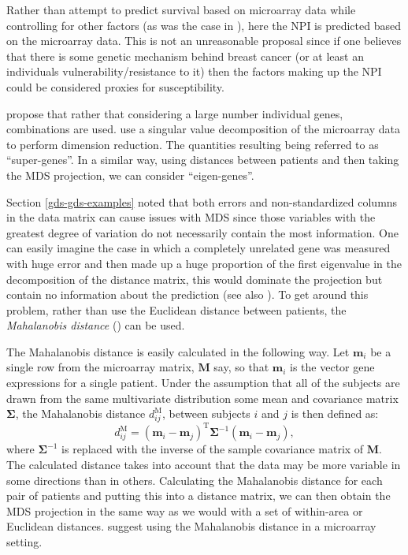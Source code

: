 Rather than attempt to predict survival based on microarray data while controlling for other factors (\label{cor-5s12}as was the case in ), here the NPI is predicted based on the microarray data. This is not an unreasonable proposal since if one believes that there is some genetic mechanism behind breast cancer (or at least an individuals vulnerability/resistance to it) then the factors making up the NPI could be considered proxies for susceptibility. 

 propose that rather that considering a large number individual genes, combinations are used.  use a singular value decomposition of the microarray data to perform dimension reduction. The quantities resulting being referred to as ``super-genes''. In a similar way, using distances between patients and then taking the MDS projection, we can consider ``eigen-genes''.

Section \ref{gds-gds-examples} noted that both errors and non-standardized columns in the data matrix can cause issues with MDS since those variables with the greatest degree of variation do not necessarily contain the most information. One can easily imagine the case in which a completely unrelated gene was measured with huge error and then made up a huge proportion of the first eigenvalue in the decomposition of the distance matrix, this would dominate the projection but contain no information about the prediction (see also \cite[pp. 220-221]{ernstbook}). To get around this problem, rather than use the Euclidean distance between patients, the \textit{Mahalanobis distance} (\cite{mahalanobis}) can be used.

The Mahalanobis distance is easily calculated in the following way. Let \label{cor-5s13}$\mathbf{m}_{i}$ be a single row from the microarray matrix, $\mathbf{M}$ say, so that $\mathbf{m}_{i}$ is the vector gene expressions for a single patient. Under the assumption that all of the subjects are drawn from the same multivariate distribution some mean and covariance matrix $\mathbf{\Sigma}$, the Mahalanobis distance $d^\text{M}_{ij}$, between subjects $i$ and $j$ is then defined as:
\begin{equation}
d^\text{M}_{ij} = (\mathbf{m}_{i} - \mathbf{m}_{j})^\text{T} \mathbf{\Sigma}^{-1} (\mathbf{m}_{i} - \mathbf{m}_{j}),
\end{equation}
where $\mathbf{\Sigma}^{-1}$ is replaced with the inverse of the sample covariance matrix of $\mathbf{M}$. The calculated distance takes into account that the data may be more variable in some directions than in others. Calculating the Mahalanobis distance for each pair of patients and putting this into a distance matrix, we can then obtain the MDS projection in the same way as we would with a set of within-area or Euclidean distances.  suggest using the Mahalanobis distance in a microarray setting.

